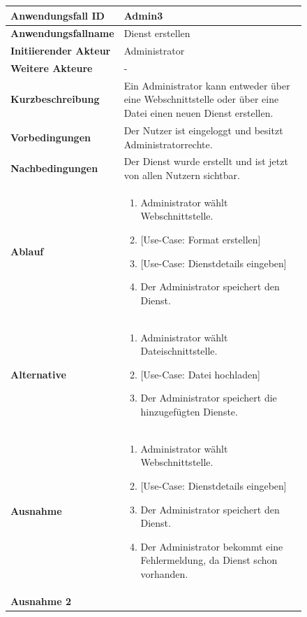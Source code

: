 \begin{figure}[h]
	\centering
	\begin{tabularx}{\textwidth}{ X | X }
		\textbf{Anwendungsfall ID} & Admin3 \\ \hline
		\textbf{Anwendungsfallname} & Dienst erstellen \\ \hline
		\textbf{Initiierender Akteur} & Administrator\\ \hline
		\textbf{Weitere Akteure} & -  \\ \hline
		\textbf{Kurzbeschreibung} & Ein Administrator kann entweder über eine Webschnittstelle oder über eine Datei einen neuen Dienst erstellen.  \\ \hline
		\textbf{Vorbedingungen} & Der Nutzer ist eingeloggt und besitzt Administratorrechte.  \\ \hline
		\textbf{Nachbedingungen} & Der Dienst wurde erstellt und ist jetzt von allen Nutzern sichtbar.  \\ \hline
		\textbf{Ablauf} &
		\begin{enumerate}
			\item Administrator wählt Webschnittstelle.
      \item {[Use-Case: Format erstellen]}
			\item {[Use-Case: Dienstdetails eingeben]}
			\item Der Administrator speichert den Dienst.
		\end{enumerate} \\ \hline
		\textbf{Alternative} &
    \begin{enumerate}
			\item Administrator wählt Dateischnittstelle.
			\item {[Use-Case: Datei hochladen]}
			\item Der Administrator speichert die hinzugefügten Dienste.
		\end{enumerate} \\ \hline
		\textbf{Ausnahme} &
    \begin{enumerate}
			\item Administrator wählt Webschnittstelle.
			\item {[Use-Case: Dienstdetails eingeben]}
			\item Der Administrator speichert den Dienst.
      \item Der Administrator bekommt eine Fehlermeldung, da Dienst schon vorhanden.
		\end{enumerate} \\ \hline
    \textbf{Ausnahme 2} &
		\begin{enumerate}

\end{enumerate}
\end{tabularx}
\end{figure}
